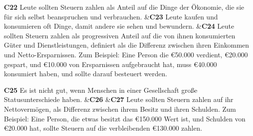 \documentclass[
		11pt,
		a4paper,
		openright,
		oneside,
		ngerman
	]
	{book}
\begin{document}
\begin{longtabu}[htpb]
\textbf{C22} %
		Leute sollten Steuern zahlen als Anteil auf die Dinge der Ökonomie, die sie für sich selbst beanspruchen und verbrauchen.
&\textbf{C23} %
		Leute kaufen und konsumieren oft Dinge, damit andere sie sehen und bewundern.
&\textbf{C24} %
		Leute sollten Steuern zahlen als progressiven Anteil auf die von ihnen konsumierten Güter und Dienstleistungen, definiert als die Differenz zwischen ihren Einkommen und Netto-Ersparnissen.
		Zum Beispiel: Eine Person die \euro 50.000 verdient, \euro 20.000 gespart, und \euro 10.000 von Ersparnissen aufgebraucht hat, muss \euro 40.000 konsumiert haben, und sollte darauf besteuert werden.
\\

\midrule

\textbf{C25}
		Es ist nicht gut, wenn Menschen in einer Gesellschaft große Statusunterschiede haben.
&\textbf{C26}
&\textbf{C27} %
		Leute sollten Steuern zahlen auf ihr Nettovermögen, als Differenz zwischen ihrem Besitz und ihren Schulden.
		Zum Beispiel: Eine Person, die etwas besitzt das \euro 150.000 Wert ist, und Schulden von \euro 20.000 hat, sollte Steuern auf die verbleibenden \euro 130.000 zahlen.
\\

\midrule


\end{longtabu}
\end{document}
